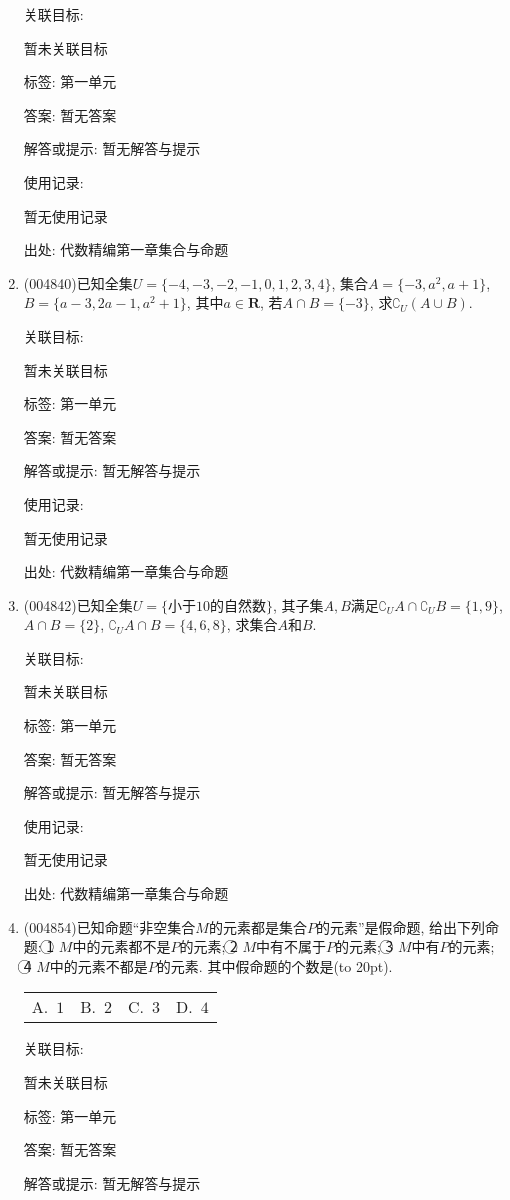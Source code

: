 \documentclass[10pt,a4paper]{article}
\newcommand{\bracket}[1]{(\hbox to #1pt{})}
\newcommand{\fourch}[4]{\par\begin{tabular}{p{.23\textwidth}p{.23\textwidth}p{.23\textwidth}p{.23\textwidth}}
A.~#1 &B.~#2& C.~#3& D.~#4
\end{tabular}}
\begin{document}
\begin{enumerate}[1.]
关联目标:

暂未关联目标



标签: 第一单元

答案: 暂无答案

解答或提示: 暂无解答与提示

使用记录:

暂无使用记录


出处: 代数精编第一章集合与命题
\item { (004840)}已知全集$U=\{-4,-3,-2,-1,0,1,2,3,4\}$, 集合$A=\{-3,a^2,a+1\}$, $B=\{a-3,2a-1,a^2+1\}$, 其中$a\in \mathbf{R}$, 若$A\cap B=\{-3\}$, 求$\complement_U(A\cup B)$.


关联目标:

暂未关联目标



标签: 第一单元

答案: 暂无答案

解答或提示: 暂无解答与提示

使用记录:

暂无使用记录


出处: 代数精编第一章集合与命题
\item { (004842)}已知全集$U=\{\text{小于}10\text{的自然数}\}$, 其子集$A,B$满足$\complement_UA\cap \complement_UB=\{1,9\}$, $A\cap B=\{2\}$, $\complement_UA\cap B=\{4,6,8\}$, 求集合$A$和$B$.


关联目标:

暂未关联目标



标签: 第一单元

答案: 暂无答案

解答或提示: 暂无解答与提示

使用记录:

暂无使用记录


出处: 代数精编第一章集合与命题
\item { (004854)}已知命题``非空集合$M$的元素都是集合$P$的元素''是假命题, 给出下列命题: \textcircled{1} $M$中的元素都不是$P$的元素; \textcircled{2} $M$中有不属于$P$的元素; \textcircled{3} $M$中有$P$的元素; \textcircled{4} $M$中的元素不都是$P$的元素. 其中假命题的个数是\bracket{20}.
\fourch{$1$}{$2$}{$3$}{$4$}


关联目标:

暂未关联目标



标签: 第一单元

答案: 暂无答案

解答或提示: 暂无解答与提示


\end{enumerate}
\end{document}
